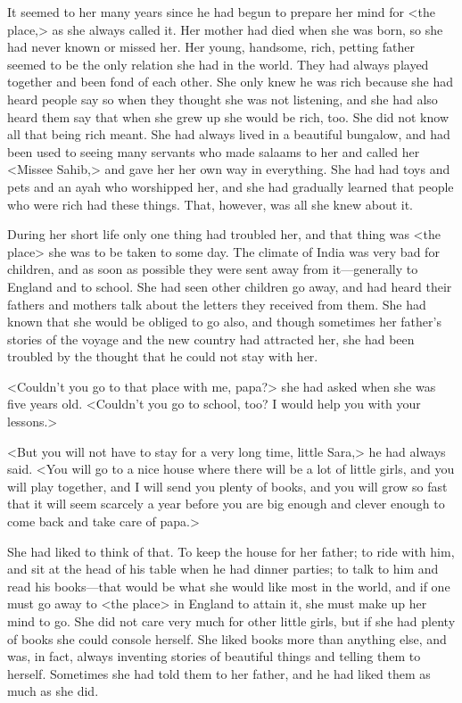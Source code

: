 It seemed to her many years since he had begun to prepare her mind for <the place,> as she always called it. Her mother had died when she was born, so she had never known or missed her. Her young, handsome, rich, petting father seemed to be the only relation she had in the world. They had always played together and been fond of each other. She only knew he was rich because she had heard people say so when they thought she was not listening, and she had also heard them say that when she grew up she would be rich, too. She did not know all that being rich meant. She had always lived in a beautiful bungalow, and had been used to seeing many servants who made salaams to her and called her <Missee Sahib,> and gave her her own way in everything. She had had toys and pets and an ayah who worshipped her, and she had gradually learned that people who were rich had these things. That, however, was all she knew about it.

During her short life only one thing had troubled her, and that thing was <the place> she was to be taken to some day. The climate of India was very bad for children, and as soon as possible they were sent away from it—generally to England and to school. She had seen other children go away, and had heard their fathers and mothers talk about the letters they received from them. She had known that she would be obliged to go also, and though sometimes her father's stories of the voyage and the new country had attracted her, she had been troubled by the thought that he could not stay with her.

<Couldn't you go to that place with me, papa?> she had asked when she was five years old. <Couldn't you go to school, too? I would help you with your lessons.>

<But you will not have to stay for a very long time, little Sara,> he had always said. <You will go to a nice house where there will be a lot of little girls, and you will play together, and I will send you plenty of books, and you will grow so fast that it will seem scarcely a year before you are big enough and clever enough to come back and take care of papa.>

She had liked to think of that. To keep the house for her father; to ride with him, and sit at the head of his table when he had dinner parties; to talk to him and read his books—that would be what she would like most in the world, and if one must go away to <the place> in England to attain it, she must make up her mind to go. She did not care very much for other little girls, but if she had plenty of books she could console herself. She liked books more than anything else, and was, in fact, always inventing stories of beautiful things and telling them to herself. Sometimes she had told them to her father, and he had liked them as much as she did.

